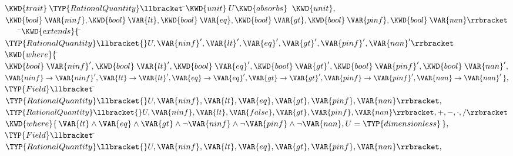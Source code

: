 \begin{Fortress}
\(\KWD{trait}\:\TYP{RationalQuantity}\llbracket\,\null\)\pushtabs\=\+\(\KWD{unit}\:U \KWD{absorbs}\;\;\KWD{unit},\)\\
\(                        \KWD{bool}\:\VAR{ninf}, \KWD{bool}\:\VAR{lt}, \KWD{bool}\:\VAR{eq}, \KWD{bool}\:\VAR{gt}, \KWD{bool}\:\VAR{pinf}, \KWD{bool}\:\VAR{nan}\rrbracket\)\-\\\poptabs
{\tt~~~~}\pushtabs\=\+\(    \KWD{extends} \{\, \null\)\pushtabs\=\+\(\TYP{RationalQuantity}\llbracket{}U, \VAR{ninf}', \VAR{lt}', \VAR{eq}', \VAR{gt}', \VAR{pinf}', \VAR{nan}'\rrbracket\)\\
\(              \KWD{where} \{\, \null\)\pushtabs\=\+\(\KWD{bool}\:\VAR{ninf}', \KWD{bool}\:\VAR{lt}', \KWD{bool}\:\VAR{eq}', \KWD{bool}\:\VAR{gt}', \KWD{bool}\:\VAR{pinf}', \KWD{bool}\:\VAR{nan}',\)\\
\(                      \VAR{ninf} \rightarrow  \VAR{ninf}', \VAR{lt} \rightarrow \VAR{lt}', \VAR{eq} \rightarrow \VAR{eq}', \VAR{gt} \rightarrow \VAR{gt}', \VAR{pinf} \rightarrow \VAR{pinf}', \VAR{nan} \rightarrow \VAR{nan}'\,\},\)\-\\\poptabs
\(              \TYP{Field}\llbracket\,\null\)\pushtabs\=\+\(\TYP{RationalQuantity}\llbracket{}U, \VAR{ninf}, \VAR{lt}, \VAR{eq}, \VAR{gt}, \VAR{pinf}, \VAR{nan}\rrbracket,\)\\
\(                     \TYP{RationalQuantity}\llbracket{}U, \VAR{ninf}, \VAR{lt}, \VAR{false}, \VAR{gt}, \VAR{pinf}, \VAR{nan}\rrbracket,+,-,\cdot,/\rrbracket\)\-\\\poptabs
\(              \KWD{where} \{\,\VAR{lt} \wedge \VAR{eq} \wedge \VAR{gt} \wedge \neg \VAR{ninf} \wedge \neg \VAR{pinf} \wedge \neg \VAR{nan}, U = \mathbin{\TYP{dimensionless}}\,\},\)\\
\(              \TYP{Field}\llbracket\,\null\)\pushtabs\=\+\(\TYP{RationalQuantity}\llbracket{}U, \VAR{ninf}, \VAR{lt}, \VAR{eq}, \VAR{gt}, \VAR{pinf}, \VAR{nan}\rrbracket,\)\\

\end{Fortress}
